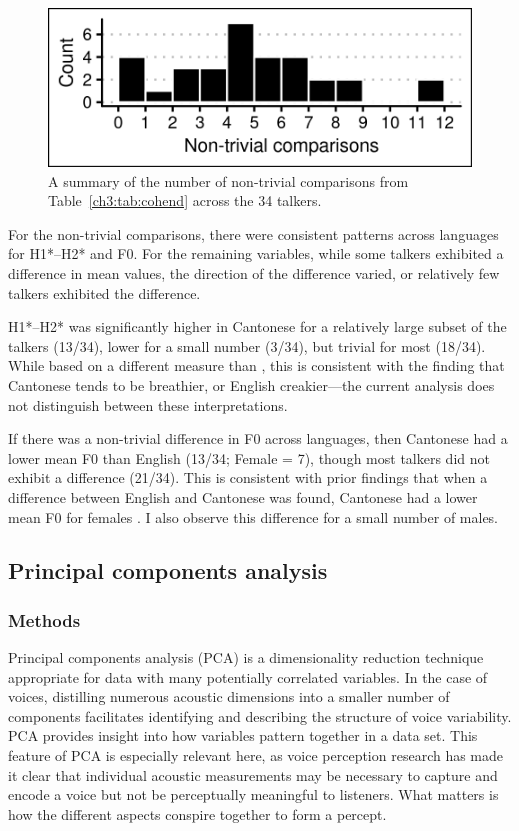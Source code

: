 \begin{figure}[htbp]
\begin{center}
\includegraphics[width=0.875\linewidth]{figures/3-non-trivial_counts_by_talker.png} 
\caption{A summary of the number of non-trivial comparisons from Table~\ref{ch3:tab:cohend} across the 34 talkers.}
\label{ch3:fig:ntcounts}
\end{center}
\end{figure}

For the non-trivial comparisons, there were consistent patterns across languages for H1*--H2* and F0. For the remaining variables, while some talkers exhibited a difference in mean values, the direction of the difference varied, or relatively few talkers exhibited the difference. 

H1*--H2* was significantly higher in Cantonese for a relatively large subset of the talkers (13/34), lower for a small number (3/34), but trivial for most (18/34). While based on a different measure than \citep{ng_2012_ltas}, this is consistent with the finding that Cantonese tends to be breathier, or English creakier---the current analysis does not distinguish between these interpretations.

If there was a non-trivial difference in F0 across languages, then Cantonese had a lower mean F0 than English (13/34; Female = 7), though most talkers did not exhibit a difference (21/34). This is consistent with prior findings that when a difference between English and Cantonese was found, Cantonese had a lower mean F0 for females \citep{ng_2012_ltas,altenberg_2006_f0}. I also observe this difference for a small number of males. 


\subsection{Principal components analysis}\label{ch3:sec:pca}
\subsubsection{Methods}
Principal components analysis (PCA) is a dimensionality reduction technique appropriate for data with many potentially correlated variables. In the case of voices, distilling numerous acoustic dimensions into a smaller number of components facilitates identifying and describing the structure of voice variability. PCA provides insight into how variables pattern together in a data set. This feature of PCA is especially relevant here, as voice perception research has made it clear that individual acoustic measurements may be necessary to capture and encode a voice but not be perceptually meaningful to listeners. What matters is how the different aspects conspire together to form a percept. %

